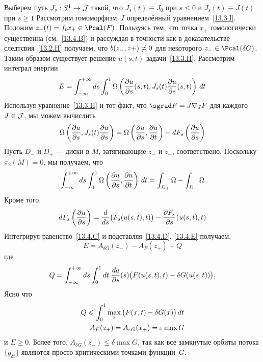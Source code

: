 Выберем путь $J_{s}:S^{1}\to\mathcal{J}$ такой, что $J_{s}(t)\equiv J_{0}$
при $s\le0$ и $J_{s}(t)\equiv J(t)$ при $s\ge1$
Рассмотрим гомоморфизм, $I$ определённый уравнением~\ref{13.3.I}.
Положим $z_{+}(t)=f_{t}x_{+}\in\Pcal(F)$.
Пользуясь тем, что точка $x_{+}$ гомологически существенна
(см.~\ref{13.4.B}) и рассуждая в точности как в доказательстве
следтсвия~\ref{13.2.H} получаем, что $b(z_{-}, z+)\z\neq 0$ для
некоторого $z_{-}\in\Pcal(\delta G)$.
Таким образом существует решение $u(s, t)$ задачи~\ref{13.3.H}.
Рассмотрим интеграл энергии
\[
E=
\int_{-\infty}^{+\infty}d s
\int_{0}^{1}
\Omega\left(\frac{\partial u}{\partial s}(s,t),
J_{s}(t)\frac{\partial u}{\partial s}(s,t)\right)
\,d t
\]
Используя уравнение~\ref{13.3.H} и тот факт, что
$\sgrad F=J\nabla_{J}F$ для каждого $J\in\mathcal{J}$, мы можем вычислить
\begin{equation}\label{13.4.C}
  \Omega\left(\frac{\partial u}{\partial s},
  J_{s}(t)\frac{\partial u}{\partial s}\right)
  =
  \Omega\left(\frac{\partial u}{\partial s},
         \frac{\partial u}{\partial t}\right)
  -
  d F_{s}\left(\frac{\partial u}{\partial s}\right)
\end{equation}
Пусть $D_{-}$ и $D_{+}$ ---  диски в $M$,
затягивающие $z_{-}$ и
$z_{+}$, соответствено.  Поскольку $π_{2}(M)=0$, мы получаем, что
\begin{equation}\label{13.4.D}
  \int_{-\infty}^{+\infty}d s
  \int_{0}^{1}
  \Omega\left(\frac{\partial u}{\partial s},
  \frac{\partial u}{\partial t}\right)
  \,d t
  =
  \int_{D_{+}}\Omega-\int_{D_{-}}\Omega
\end{equation}
Кроме того,
\begin{equation}\label{13.4.E}
  d F_{s}\left(\frac{\partial u}{\partial s}\right)
  =
  \frac{d}{d s}\big(F_{s}(u(s,t),t)\big) -
  \frac{\partial F_{s}}{\partial s}(u(s,t),t)  
\end{equation}
Интегрируя равенство~\ref{13.4.C} и подставляя~\ref{13.4.D}, \ref{13.4.E}
получаем,
\[
E=A_{\delta G}(z_{-})-A_{F}(z_{+})+Q
\]
где
\[
Q=\int_{-\infty}^{+\infty}d s
  \int_{0}^{1}d t\;
  \frac{d a}{\partial s}(s)\big(F(u(s,t),t)-\delta G(u(s,t))\big),
\]
Ясно что
\begin{align*}
  Q\leqslant
  \int_{0}^{1} \max_{x}\big(F(x,t)-\delta G(x)\big)\,d t\\
  A_{F}(z_{+})=A_{\varepsilon G}(x_{+})=\varepsilon\max G
\end{align*}
и $E\ge0$.
Более того, $A_{\delta G}(z_{-})\le \delta\max G$, так как все
замкнутые орбиты потока $\{g_{\delta t}\}$ являются просто
критическими точками функции~$G$.

